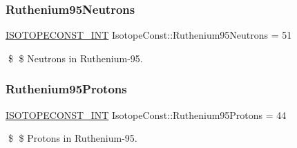 \subsubsection{\texorpdfstring{Ruthenium95\+Neutrons}{Ruthenium95Neutrons}}
{\footnotesize\ttfamily \mbox{\hyperlink{group___isotope_const-_macros_ga5f18360b3e99483a35c32d789e62621c}{I\+S\+O\+T\+O\+P\+E\+C\+O\+N\+S\+T\+\_\+\+I\+NT}} Isotope\+Const\+::\+Ruthenium95\+Neutrons = 51}

\$ \$ Neutrons in Ruthenium-\/95. \mbox{\label{group___isotope_const-_ruthenium-_ru95_ga05204c959c06a9ed522a542b5711993e}} 
\subsubsection{\texorpdfstring{Ruthenium95\+Protons}{Ruthenium95Protons}}
{\footnotesize\ttfamily \mbox{\hyperlink{group___isotope_const-_macros_ga5f18360b3e99483a35c32d789e62621c}{I\+S\+O\+T\+O\+P\+E\+C\+O\+N\+S\+T\+\_\+\+I\+NT}} Isotope\+Const\+::\+Ruthenium95\+Protons = 44}

\$ \$ Protons in Ruthenium-\/95. 
